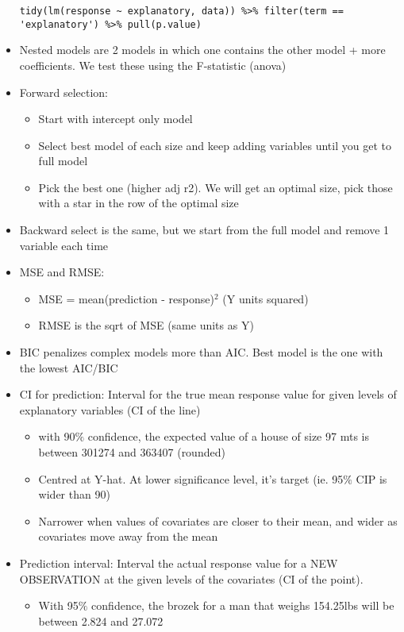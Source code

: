 \documentclass[8pt,landscape,a4paper, fleqn, dvipsnames]{extarticle}
\begin{document}
\begin{multicols*}{4}
\begin{itemize}
\begin{lstlisting}
tidy(lm(response ~ explanatory, data)) %>% filter(term == 'explanatory') %>% pull(p.value)
    \end{lstlisting}
    \item Nested models are 2 models in which one contains the other model + more coefficients. We test these using the F-statistic (anova)
    \item Forward selection:
    \begin{itemize}
        \item Start with intercept only model
        \item Select best model of each size and keep adding variables until you get to full model
        \item Pick the best one (higher adj r2). We will get an optimal size, pick those with a star in the row of the optimal size
    \end{itemize}
    \item Backward select is the same, but we start from the full model and remove 1 variable each time
    \item MSE and RMSE:
    \begin{itemize}
        \item MSE = mean(prediction - response)$^2$ (Y units squared)
        \item RMSE is the sqrt of MSE (same units as Y)
    \end{itemize}
    \item BIC penalizes complex models more than AIC. Best model is the one with the lowest AIC/BIC
    \item CI for prediction: Interval for the true mean response value for given levels of explanatory variables (CI of the line)
    \begin{itemize}
        \item with 90$\%$ confidence, the expected value of a house of size 97 mts is between 301274 and 363407 (rounded)
        \item Centred at Y-hat. At lower significance level, it's target (ie. 95$\%$ CIP is wider than 90)
        \item Narrower when values of covariates are closer to their mean, and wider as covariates move away from the mean
    \end{itemize}
    \item Prediction interval: Interval the actual response value for a NEW OBSERVATION at the given levels of the covariates (CI of the point).
    \begin{itemize}
        \item With 95$\%$ confidence, the brozek for a man that weighs 154.25lbs will be between 2.824 and 27.072

\end{itemize}
\end{itemize}
\end{multicols*}
\end{document}
